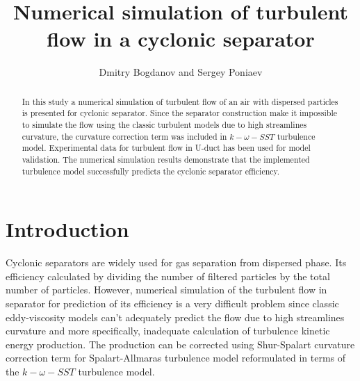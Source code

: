 \documentclass[a4paper]{jpconf}
\begin{document}

\title{Numerical simulation of turbulent flow in a cyclonic separator}

\author{Dmitry Bogdanov and Sergey Poniaev}

\address{Division of Plasma Physics, Atomic Physics and Astrophysics, Ioffe Physical Technical Institute, 26 Polytekhnicheskaya, St Petersburg 194021, Russian Federation}


\begin{abstract}
In this study a numerical simulation of turbulent flow of an air with dispersed particles is presented for cyclonic separator. Since the separator construction make it impossible to simulate the flow using the classic turbulent models due to high streamlines curvature, the curvature correction term was included in $k-\omega-SST$ turbulence model. Experimental data for turbulent flow in U-duct has been used for model validation. The numerical simulation results demonstrate that the implemented turbulence model successfully predicts the cyclonic separator efficiency.
\end{abstract}

\section{Introduction}
Cyclonic separators are widely used for gas separation from dispersed phase. Its efficiency calculated by dividing the number of filtered particles by the total number of particles. However, numerical simulation of the turbulent flow in separator for prediction of its efficiency is a very difficult problem since classic eddy-viscosity models can't adequately predict the flow\cite{ShurSpallart} due to high streamlines curvature and more specifically, inadequate calculation of turbulence kinetic energy production. The production can be corrected using Shur-Spalart curvature correction term for Spalart-Allmaras turbulence model reformulated\cite{Smirnov} in terms of the $k-\omega-SST$ turbulence model.
\end{document}

